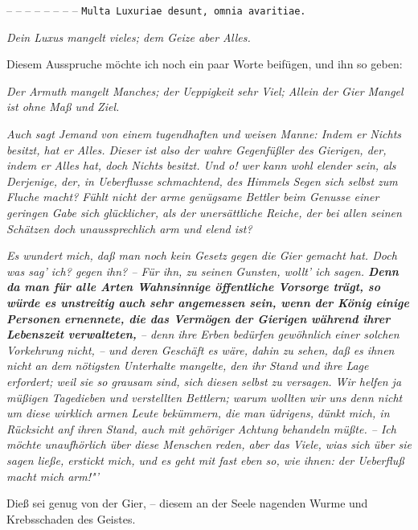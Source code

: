 \medskip


– – – – – – – – \texttt{Multa
Luxuriae desunt, omnia avaritiae.}

\textit{Dein Luxus mangelt vieles; dem Geize aber Alles.}

Diesem Ausspruche möchte ich noch ein paar Worte beifügen, und ihn so geben:

\textit{Der Armuth mangelt Manches; der Ueppigkeit sehr Viel;
Allein der Gier Mangel ist ohne Maß und Ziel.}

\textit{Auch sagt Jemand von einem tugendhaften und weisen Manne: Indem er Nichts
besitzt, hat er Alles. Dieser ist also der wahre Gegenfüßler des Gierigen, der,
indem er Alles hat, doch Nichts besitzt. Und o! wer kann wohl elender sein, als
Derjenige, der, in Ueberflusse schmachtend, des Himmels Segen sich selbst zum
Fluche macht? Fühlt nicht der arme genügsame Bettler beim Genusse einer geringen
Gabe sich glücklicher, als der unersättliche Reiche, der bei allen seinen
Schätzen doch unaussprechlich arm und elend ist?}

\medskip

\textit{Es wundert mich, daß man noch kein Gesetz gegen die Gier gemacht hat. Doch was
sag’ ich? gegen ihn? – Für ihn, zu seinen Gunsten, wollt’ ich sagen. \textbf{Denn da man
für alle Arten Wahnsinnige öffentliche Vorsorge trägt, so würde es unstreitig
auch sehr angemessen sein, wenn der König einige Personen ernennete, die das
Vermögen der Gierigen während ihrer Lebenszeit verwalteten,} -- denn ihre Erben
bedürfen gewöhnlich einer solchen Vorkehrung nicht, -- und deren Geschäft es
wäre, dahin zu sehen, daß es ihnen nicht an dem nötigsten Unterhalte mangelte,
den ihr Stand und ihre Lage erfordert; weil sie so grausam sind, sich diesen
selbst zu versagen. Wir helfen ja müßigen Tagedieben und verstellten Bettlern;
warum wollten wir uns denn nicht um diese wirklich armen Leute bekümmern, die
man üdrigens, dünkt mich, in Rücksicht anf ihren Stand, auch mit gehöriger
Achtung behandeln müßte. -- Ich möchte unaufhörlich über diese Menschen reden,
aber das Viele, wias sich über sie sagen ließe, erstickt mich, und es geht mit
fast eben so, wie ihnen: der Ueberfluß macht mich arm!"'}

\medskip

Dieß sei genug von der Gier, -- diesem an der Seele nagenden Wurme und Krebsschaden
des Geistes.


